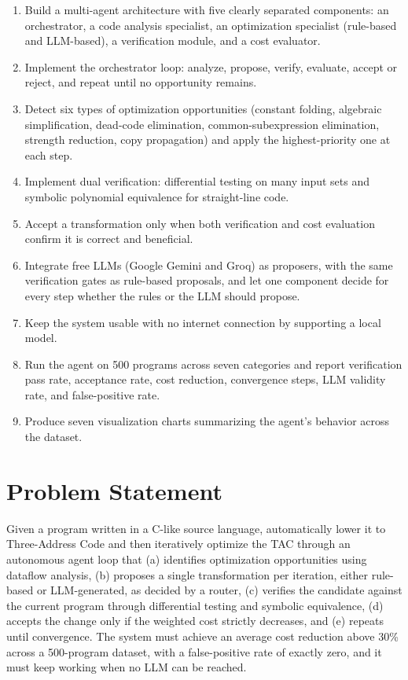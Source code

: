 \documentclass[12pt,a4paper]{report}
\begin{document}
\begin{enumerate}[leftmargin=2cm]
  \item Build a multi-agent architecture with five clearly separated components: an orchestrator, a code analysis specialist, an optimization specialist (rule-based and LLM-based), a verification module, and a cost evaluator.
  \item Implement the orchestrator loop: analyze, propose, verify, evaluate, accept or reject, and repeat until no opportunity remains.
  \item Detect six types of optimization opportunities (constant folding, algebraic simplification, dead-code elimination, common-subexpression elimination, strength reduction, copy propagation) and apply the highest-priority one at each step.
  \item Implement dual verification: differential testing on many input sets and symbolic polynomial equivalence for straight-line code.
  \item Accept a transformation only when both verification and cost evaluation confirm it is correct and beneficial.
  \item Integrate free LLMs (Google Gemini and Groq) as proposers, with the same verification gates as rule-based proposals, and let one component decide for every step whether the rules or the LLM should propose.
  \item Keep the system usable with no internet connection by supporting a local model.
  \item Run the agent on 500 programs across seven categories and report verification pass rate, acceptance rate, cost reduction, convergence steps, LLM validity rate, and false-positive rate.
  \item Produce seven visualization charts summarizing the agent's behavior across the dataset.
\end{enumerate}

\section{Problem Statement}

Given a program written in a C-like source language, automatically lower it to Three-Address Code and then iteratively optimize the TAC through an autonomous agent loop that (a) identifies optimization opportunities using dataflow analysis, (b) proposes a single transformation per iteration, either rule-based or LLM-generated, as decided by a router, (c) verifies the candidate against the current program through differential testing and symbolic equivalence, (d) accepts the change only if the weighted cost strictly decreases, and (e) repeats until convergence. The system must achieve an average cost reduction above 30\% across a 500-program dataset, with a false-positive rate of exactly zero, and it must keep working when no LLM can be reached.
\end{document}
